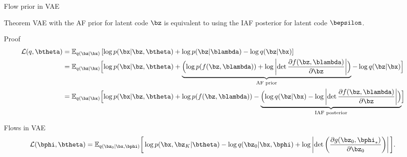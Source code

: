 \begin{frame}{Flow prior in VAE}
	\begin{block}{Theorem}
	VAE with the AF prior for latent code $\bz$ is equivalent to using the IAF posterior for latent code $\bepsilon$.
	\end{block}
	\begin{block}{Proof}
	\vspace{-0.5cm}
	{\footnotesize
	\begin{align*}
	\mathcal{L}(q, \btheta) &= \mathbb{E}_{q(\bz | \bx)} \left[ \log p(\bx | \bz, \btheta) +  \log p(\bz | \blambda) - \log q(\bz | \bx) \right] \\
	&= \mathbb{E}_{q(\bz | \bx)} \Bigl[ \log p(\bx | \bz, \btheta) + \underbrace{ \Bigl( \log p(f(\bz, \blambda)) + \log \left| \det \frac{\partial f(\bz, \blambda)}{\partial \bz} \right| \Bigr) }_{\text{AF prior}} - \log q(\bz | \bx) \Bigr] \\
	&= \mathbb{E}_{q(\bz | \bx)} \Bigl[ \log p(\bx | \bz, \btheta) +  \log p(f(\bz, \blambda)) - \underbrace{ \Bigl( \log q(\bz | \bx) - \log \left| \det \frac{\partial f(\bz, \blambda)}{\partial \bz} \right| \Bigr) }_{\text{IAF posterior}} \Bigr]
	\end{align*}
	}
	\end{block}
	\vspace{-0.5cm}
	\begin{block}{Flows in VAE}
		\vspace{-0.3cm}
		{\footnotesize
		\[
			\mathcal{L} (\bphi, \btheta) 
			= \mathbb{E}_{q(\bz_0 | \bx, \bphi)} \bigg[\log p(\bx, \bz_K | \btheta) -  \log q(\bz_0 | \bx, \bphi ) +   \log \left| \det \left( \frac{\partial g(\bz_0, \bphi_*)}{\partial \bz_0} \right) \right| \bigg].
		\]
		}
	\end{block}
\end{frame}

